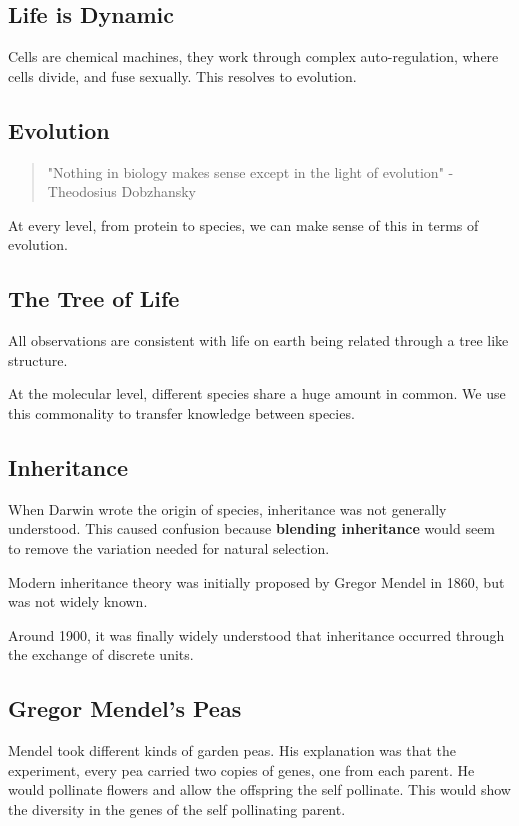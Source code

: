 \subsection{Life is Dynamic}
Cells are chemical machines, they work through complex auto-regulation, where cells divide, and fuse sexually. This resolves to evolution.

\subsection{Evolution}

\begin{quote}
    "Nothing in biology makes sense except in the light of evolution" - Theodosius Dobzhansky
\end{quote}
At every level, from protein to species, we can make sense of this in terms of evolution.

\subsection{The Tree of Life}
All observations are consistent with life on earth being related through a tree like structure.

\par\noindent At the molecular level, different species share a huge amount in common. We use this commonality to transfer knowledge between species.

\subsection{Inheritance}
When Darwin wrote the origin of species, inheritance was not generally understood. This caused confusion because \textbf{blending inheritance} would seem to remove the variation needed for natural selection.

\par\noindent Modern inheritance theory was initially proposed by Gregor Mendel in 1860, but was not widely known. \\

\par\noindent Around 1900, it was finally widely understood that inheritance occurred through the exchange of discrete units.

\subsection{Gregor Mendel's Peas}
Mendel took different kinds of garden peas. His explanation was that the experiment, every pea carried two copies of genes, one from each parent. He would pollinate flowers and allow the offspring the self pollinate. This would show the diversity in the genes of the self pollinating parent.

